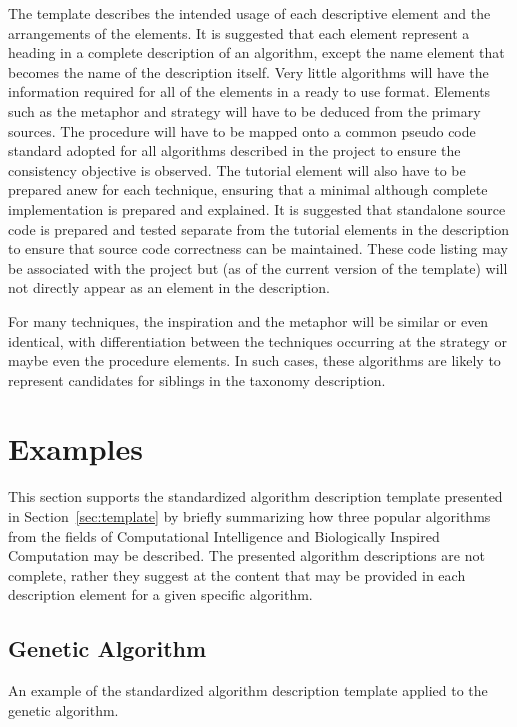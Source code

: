 \documentclass[a4paper, 11pt]{article}
\begin{document}
The template describes the intended usage of each descriptive element and the arrangements of the elements. It is suggested that each element represent a heading in a complete description of an algorithm, except the name element that becomes the name of the description itself. Very little algorithms will have the information required for all of the elements in a ready to use format. Elements such as the metaphor and strategy will have to be deduced from the primary sources. The procedure will have to be mapped onto a common pseudo code standard adopted for all algorithms described in the project to ensure the consistency objective is observed. The tutorial element will also have to be prepared anew for each technique, ensuring that a minimal although complete implementation is prepared and explained. It is suggested that standalone source code is prepared and tested separate from the tutorial elements in the description to ensure that source code correctness can be maintained. These code listing may be associated with the project but (as of the current version of the template) will not directly appear as an element in the description.  

For many techniques, the inspiration and the metaphor will be similar or even identical, with differentiation between the techniques occurring at the strategy or maybe even the procedure elements. In such cases, these algorithms are likely to represent candidates for siblings in the taxonomy description.

\section{Examples} 
\label{sec:examples}
This section supports the standardized algorithm description template presented in Section~\ref{sec:template} by briefly summarizing how three popular algorithms from the fields of Computational Intelligence and Biologically Inspired Computation may be described. The presented algorithm descriptions are not complete, rather they suggest at the content that may be provided in each description element for a given specific algorithm. 

\subsection{Genetic Algorithm}
An example of the standardized algorithm description template applied to the genetic algorithm.
\end{document}
